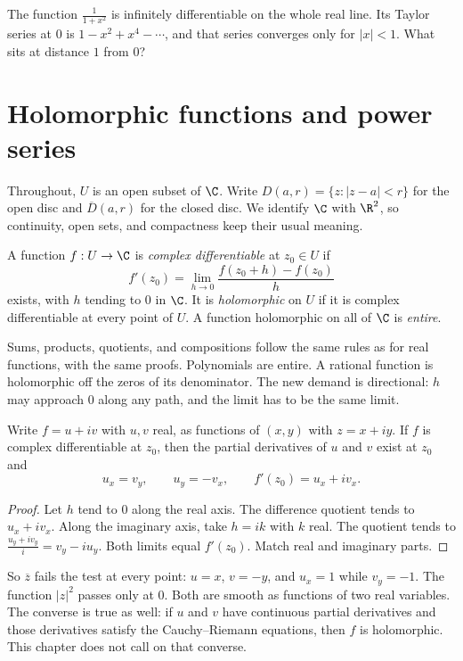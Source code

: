 \begin{think}
The function $\frac1{1+x^2}$ is infinitely differentiable on the whole real line. Its Taylor series at $0$ is $1-x^2+x^4-\cdots$, and that series converges only for $|x|<1$. What sits at distance $1$ from $0$?
\end{think}

\section{Holomorphic functions and power series}

Throughout, $U$ is an open subset of $\C$. Write $D(a,r)=\{z:|z-a|<r\}$ for the open disc and $\overline D(a,r)$ for the closed disc. We identify $\C$ with $\R^2$, so continuity, open sets, and compactness keep their usual meaning.

\begin{definition}
A function $f:U\to\C$ is \emph{complex differentiable} at $z_0\in U$ if
\[
f'(z_0)=\lim_{h\to0}\frac{f(z_0+h)-f(z_0)}h
\]
exists, with $h$ tending to $0$ in $\C$. It is \emph{holomorphic} on $U$ if it is complex differentiable at every point of $U$. A function holomorphic on all of $\C$ is \emph{entire}.
\end{definition}

Sums, products, quotients, and compositions follow the same rules as for real functions, with the same proofs. Polynomials are entire. A rational function is holomorphic off the zeros of its denominator. The new demand is directional: $h$ may approach $0$ along any path, and the limit has to be the same limit.

\begin{proposition}\label{prop:cr}
Write $f=u+iv$ with $u,v$ real, as functions of $(x,y)$ with $z=x+iy$. If $f$ is complex differentiable at $z_0$, then the partial
derivatives of $u$ and $v$ exist at $z_0$ and
\[
u_x=v_y,\qquad u_y=-v_x,\qquad f'(z_0)=u_x+iv_x.
\]
\end{proposition}
\begin{proof}
Let $h$ tend to $0$ along the real axis. The difference quotient tends to $u_x+iv_x$. Along the imaginary axis, take $h=ik$ with $k$ real. The quotient tends to $\frac{u_y+iv_y}i=v_y-iu_y$. Both limits equal $f'(z_0)$. Match real and imaginary parts.
\end{proof}

So $\overline z$ fails the test at every point: $u=x$, $v=-y$, and $u_x=1$ while $v_y=-1$. The function $|z|^2$ passes only at $0$. Both are smooth as functions of two real variables. The converse is true as well: if $u$ and $v$ have continuous partial derivatives and those derivatives satisfy the Cauchy--Riemann equations, then $f$ is holomorphic. This chapter does not call on that converse.


